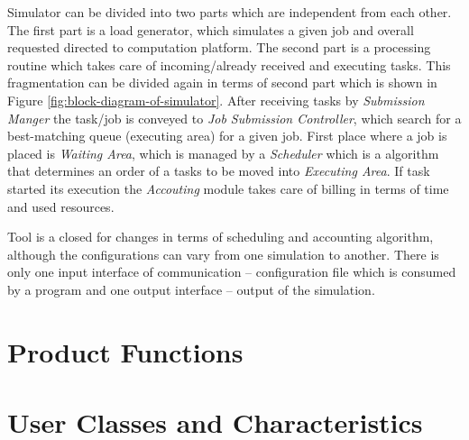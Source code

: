 	Simulator can be divided into two parts which are independent from each other. The first part is a load generator, which simulates a given job and overall requested directed to computation platform. The second part is a processing routine which takes care of incoming/already received and executing tasks. This fragmentation can be divided again in terms of second part which is shown in Figure \ref{fig:block-diagram-of-simulator}. After receiving tasks by \emph{Submission Manger} the task/job is conveyed to \emph{Job Submission Controller}, which search for a best-matching queue (executing area) for a given job. First place where a job is placed is \emph{Waiting Area}, which is managed by a \emph{Scheduler} which is a algorithm that determines an order of a tasks to be moved into \emph{Executing Area}. If task started its execution the \emph{Accouting} module takes care of billing in terms of time and used resources.
		
	Tool is a closed for changes in terms of scheduling and accounting algorithm, although the configurations can vary from one simulation to another. There is only one input interface of communication -- configuration file which is consumed by a program and one output interface -- output of the simulation.
\section{Product Functions}

\section{User Classes and Characteristics}

